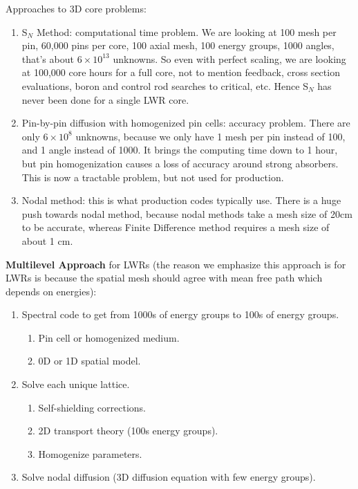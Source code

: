 \documentclass{school-22.211-notes}
\begin{document}
Approaches to 3D core problems:
\begin{enumerate}
\item S$_N$ Method: computational time problem. We are looking at 100 mesh per pin, 60,000 pins per core, 100 axial mesh, 100 energy groups, 1000 angles, that's about $6 \times 10^{13}$ unknowns. So even with perfect scaling, we are looking at 100,000 core hours for a full core, not to mention feedback, cross section evaluations, boron and control rod searches to critical, etc. Hence S$_N$ has never been done for a single LWR core. 

\item Pin-by-pin diffusion with homogenized pin cells: accuracy problem. There are only $6 \times 10^8$ unknowns, because we only have 1 mesh per pin instead of 100, and 1 angle instead of 1000. It brings the computing time down to 1 hour, but pin homogenization causes a loss of accuracy around strong absorbers. This is now a tractable problem, but not used for production.

\item Nodal method: this is what production codes typically use. There is a huge push towards nodal method, because nodal methods take a mesh size of 20cm to be accurate, whereas Finite Difference method requires a mesh size of about 1 cm. 
\end{enumerate}

\textbf{Multilevel Approach} for LWRs (the reason we emphasize this approach is for LWRs is because the spatial mesh should agree with mean free path which depends on energies):
\begin{enumerate}
\item Spectral code to get from 1000s of energy groups to 100s of energy groups. 
  \begin{enumerate}
    \item Pin cell or homogenized medium. 
    \item 0D or 1D spatial model.
  \end{enumerate}

\item Solve each unique lattice. 
  \begin{enumerate}
  \item Self-shielding corrections. 
  \item 2D transport theory (100s energy groups). 
  \item Homogenize parameters.
  \end{enumerate}

\item Solve nodal diffusion (3D diffusion equation with few energy groups). 
\end{enumerate}
\end{document}
